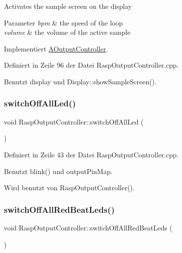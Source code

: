 Activates the sample screen on the display 
\begin{DoxyParams}{Parameter}
{\em bpm} & the speed of the loop \\
\hline
{\em volume} & the volume of the active sample \\
\hline
\end{DoxyParams}


Implementiert \hyperlink{class_a_output_controller_aab53d12a6aa6f38d0e4ead69e85ed4fe}{A\+Output\+Controller}.



Definiert in Zeile 96 der Datei Rasp\+Output\+Controller.\+cpp.



Benutzt display und Display\+::show\+Sample\+Screen().

\mbox{\label{class_rasp_output_controller_afdd3bcfa82341a9d2539233abe7cb617}} 
\subsubsection{\texorpdfstring{switch\+Off\+All\+Led()}{switchOffAllLed()}}
{\footnotesize\ttfamily void Rasp\+Output\+Controller\+::switch\+Off\+All\+Led (\begin{DoxyParamCaption}{ }\end{DoxyParamCaption})\hspace{0.3cm}{\ttfamily [private]}}



Definiert in Zeile 43 der Datei Rasp\+Output\+Controller.\+cpp.



Benutzt blink() und output\+Pin\+Map.



Wird benutzt von Rasp\+Output\+Controller().

\mbox{\label{class_rasp_output_controller_a9a5025e13e27544721a80e6725ed23e4}} 
\subsubsection{\texorpdfstring{switch\+Off\+All\+Red\+Beat\+Leds()}{switchOffAllRedBeatLeds()}}
{\footnotesize\ttfamily void Rasp\+Output\+Controller\+::switch\+Off\+All\+Red\+Beat\+Leds (\begin{DoxyParamCaption}{ }\end{DoxyParamCaption})\hspace{0.3cm}{\ttfamily [private]}}



